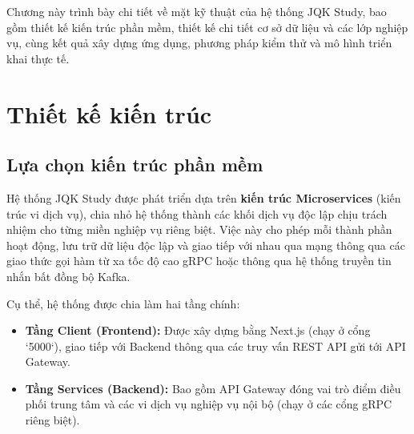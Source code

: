 \documentclass[../DoAn.tex]{subfiles}
\begin{document}
Chương này trình bày chi tiết về mặt kỹ thuật của hệ thống JQK Study, bao gồm thiết kế kiến trúc phần mềm, thiết kế chi tiết cơ sở dữ liệu và các lớp nghiệp vụ, cùng kết quả xây dựng ứng dụng, phương pháp kiểm thử và mô hình triển khai thực tế.

\section{Thiết kế kiến trúc}
\label{section:4.1}

\subsection{Lựa chọn kiến trúc phần mềm}
Hệ thống JQK Study được phát triển dựa trên \textbf{kiến trúc Microservices} (kiến trúc vi dịch vụ), chia nhỏ hệ thống thành các khối dịch vụ độc lập chịu trách nhiệm cho từng miền nghiệp vụ riêng biệt. Việc này cho phép mỗi thành phần hoạt động, lưu trữ dữ liệu độc lập và giao tiếp với nhau qua mạng thông qua các giao thức gọi hàm từ xa tốc độ cao gRPC hoặc thông qua hệ thống truyền tin nhắn bất đồng bộ Kafka.

Cụ thể, hệ thống được chia làm hai tầng chính:
\begin{itemize}
    \item \textbf{Tầng Client (Frontend):} Được xây dựng bằng Next.js (chạy ở cổng `5000`), giao tiếp với Backend thông qua các truy vấn REST API gửi tới API Gateway.
    \item \textbf{Tầng Services (Backend):} Bao gồm API Gateway đóng vai trò điểm điều phối trung tâm và các vi dịch vụ nghiệp vụ nội bộ (chạy ở các cổng gRPC riêng biệt).
\end{itemize}
\end{document}

